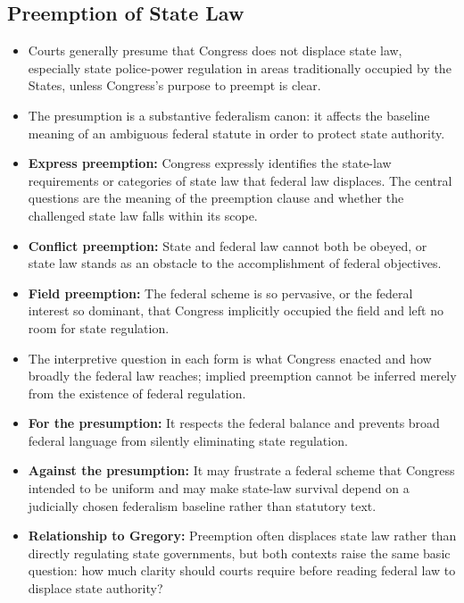 \documentclass[11pt]{tex/lawoutline}
\begin{document}
\subsection{Preemption of State Law}

{
\begin{itemize}
    \item Courts generally presume that Congress does not displace state law, especially state police-power regulation in areas traditionally occupied by the States, unless Congress's purpose to preempt is clear.
    \item The presumption is a substantive federalism canon: it affects the baseline meaning of an ambiguous federal statute in order to protect state authority.
    \item \textbf{Express preemption:} Congress expressly identifies the state-law requirements or categories of state law that federal law displaces. The central questions are the meaning of the preemption clause and whether the challenged state law falls within its scope.
    \item \textbf{Conflict preemption:} State and federal law cannot both be obeyed, or state law stands as an obstacle to the accomplishment of federal objectives.
    \item \textbf{Field preemption:} The federal scheme is so pervasive, or the federal interest so dominant, that Congress implicitly occupied the field and left no room for state regulation.
    \item The interpretive question in each form is what Congress enacted and how broadly the federal law reaches; implied preemption cannot be inferred merely from the existence of federal regulation.
    \item \textbf{For the presumption:} It respects the federal balance and prevents broad federal language from silently eliminating state regulation.
    \item \textbf{Against the presumption:} It may frustrate a federal scheme that Congress intended to be uniform and may make state-law survival depend on a judicially chosen federalism baseline rather than statutory text.
    \item \textbf{Relationship to Gregory:} Preemption often displaces state law rather than directly regulating state governments, but both contexts raise the same basic question: how much clarity should courts require before reading federal law to displace state authority?
\end{itemize}
}
\end{document}
